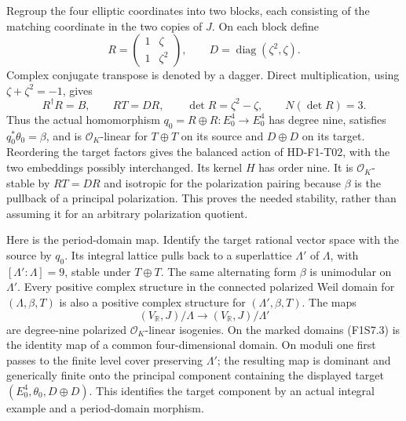 Regroup the four elliptic coordinates into two blocks, each
consisting of the matching coordinate in the two copies of $J$.
On each block define
\[
 R=\begin{pmatrix}1&\zeta\\1&\zeta^2\end{pmatrix},
 \qquad D=\operatorname{diag}(\zeta^2,\zeta).
\]
Complex conjugate transpose is denoted by a dagger. Direct
multiplication, using $\zeta+\zeta^2=-1$, gives
\[
 R^\dagger R=B,\qquad RT=DR,\qquad
 \det R=\zeta^2-\zeta,\qquad N(\det R)=3.
 \tag{F1S7.2}
\]
Thus the actual homomorphism $q_0=R\oplus R:E_0^4\to E_0^4$
has degree nine, satisfies $q_0^*\theta_0=\beta$, and is
$\mathcal O_K$-linear for $T\oplus T$ on its source and
$D\oplus D$ on its target. Reordering the target factors gives
the balanced action of HD-F1-T02, with the two embeddings
possibly interchanged. Its kernel $H$ has order nine. It is
$\mathcal O_K$-stable by $RT=DR$ and isotropic for the
polarization pairing because $\beta$ is the pullback of a
principal polarization. This proves the needed stability,
rather than assuming it for an arbitrary polarization quotient.

Here is the period-domain map. Identify the target rational
vector space with the source by $q_0$. Its integral lattice
pulls back to a superlattice $\Lambda'$ of $\Lambda$, with
$[\Lambda':\Lambda]=9$, stable under $T\oplus T$. The same
alternating form $\beta$ is unimodular on $\Lambda'$. Every
positive complex structure in the connected polarized Weil
domain for $(\Lambda,\beta,T)$ is also a positive complex
structure for $(\Lambda',\beta,T)$. The maps
\[
 (V_{\mathbb R},J)/\Lambda\longrightarrow
 (V_{\mathbb R},J)/\Lambda'
 \tag{F1S7.3}
\]
are degree-nine polarized $\mathcal O_K$-linear isogenies.
On the marked domains (F1S7.3) is the identity map of a common
four-dimensional domain. On moduli one first passes to the
finite level cover preserving $\Lambda'$; the resulting map is
dominant and generically finite onto the principal component
containing the displayed target $(E_0^4,\theta_0,D\oplus D)$.
This identifies the target component by an actual integral
example and a period-domain morphism.

